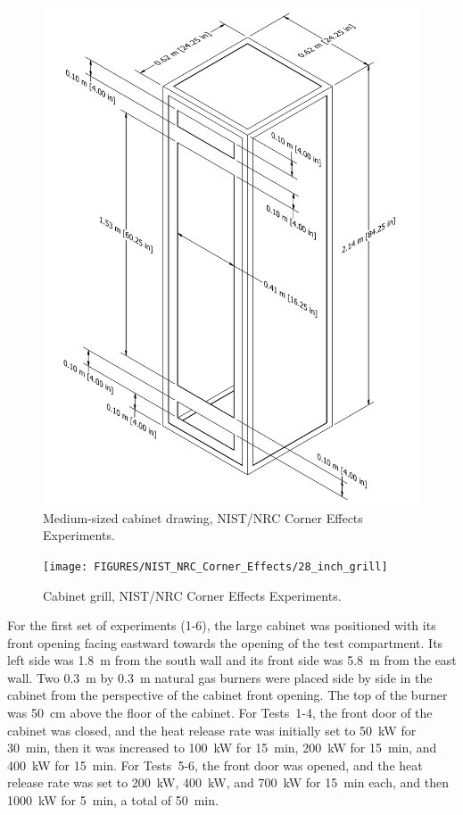 \begin{figure}[p]
\includegraphics[width=\textwidth]{FIGURES/NIST_NRC_Corner_Effects/Cabinet_2x2x7}
\caption[Medium-sized cabinet drawing, NIST/NRC Corner Effects Experiments]{Medium-sized cabinet drawing, NIST/NRC Corner Effects Experiments.}
\label{Medium_Cabinet}
\end{figure}

\begin{figure}[!ht]
\texttt{[image: FIGURES/NIST\_NRC\_Corner\_Effects/28\_inch\_grill]}
\caption[Cabinet grill, NIST/NRC Corner Effects Experiments]{Cabinet grill, NIST/NRC Corner Effects Experiments.}
\label{cabinet_grill}
\end{figure}


For the first set of experiments (1-6), the large cabinet was positioned with its front opening facing eastward towards the opening of the test compartment. Its left side was 1.8~m from the south wall and its front side was 5.8~m from the east wall. Two 0.3~m by 0.3~m natural gas burners were placed side by side in the cabinet from the perspective of the cabinet front opening. The top of the burner was 50~cm above the floor of the cabinet. For Tests~1-4, the front door of the cabinet was closed, and the heat release rate was initially set to 50~kW for 30~min, then it was increased to 100~kW for 15~min, 200~kW for 15~min, and 400~kW for 15~min. For Tests~5-6, the front door was opened, and the heat release rate was set to 200~kW, 400~kW, and 700~kW for 15~min each, and then 1000~kW for 5~min, a total of 50~min.

